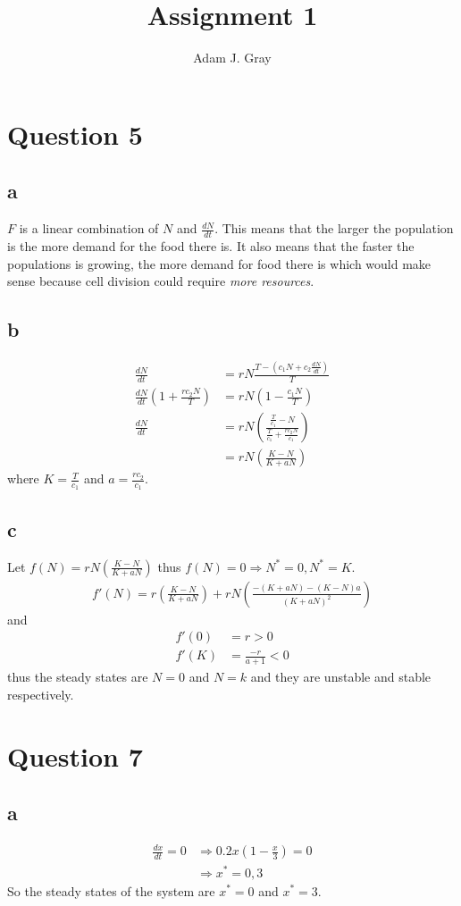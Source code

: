 \documentclass{unswmaths}
\author{Adam J. Gray}
\title{Assignment 1}
\begin{document}
\unswtitle

\section*{Question 5}
\subsection*{a}
	$ F $ is a linear combination of $ N $ and $ \frac{dN}{dt} $. This means that the larger the population is the more demand for the food there is. It also means that the faster the populations is growing, the more demand for food there is which would make sense because cell division could require \emph{more resources}.
\subsection*{b}
	\begin{align*}
		\frac{dN}{dt} &= rN \frac{T - \left(c_1N + c_2\frac{dN}{dt}\right)}{T} \\
		\frac{dN}{dt} \left( 1 + \frac{rc_2N}{T}\right) &= rN\left(1 - \frac{c_1N}{T} \right) \\
		\frac{dN}{dt} &= rN \left( \frac{\frac{T}{c_1} - N}{\frac{T}{c_1} + \frac{rc_2N}{c_1}} \right) \\
			&= rN \left( \frac{K - N}{K + aN}\right)
	\end{align*}
	where $ K = \frac{T}{c_1} $ and $ a = \frac{rc_2}{c_1} $.
\subsection*{c}
	Let $ f(N) = rN\left( \frac{K-N}{K+aN} \right) $ thus $ f(N) = 0 \Longrightarrow N^* = 0, N^* = K $.
	\begin{align*}
		f'(N) = r \left( \frac{K-N}{K+aN} \right) + rN \left( \frac{-(K+aN) - (K-N)a}{(K+aN)^2}\right)
	\end{align*}
	and
	\begin{align*}
		f'(0) &= r > 0 \\
		f'(K) &= \frac{-r}{a+1} < 0
	\end{align*}
	thus the steady states are $ N = 0 $ and $ N = k $ and they are unstable and stable respectively.
\section*{Question 7}
\subsection*{a}
	\begin{align*}
		\frac{dx}{dt} = 0 &\Longrightarrow 0.2x\left( 1 - \frac{x}{3} \right) = 0 \\
			& \Longrightarrow x^* = 0, 3
	\end{align*}
	So the steady states of the system are $ x^* = 0 $ and $ x^* = 3 $.
\end{document}
